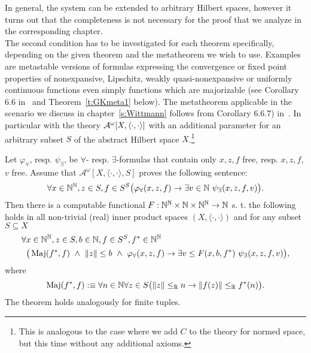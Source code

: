 In general, the system can be extended to arbitrary Hilbert spaces, however it turns out that the completeness
is not necessary for the proof that we analyze in the corresponding chapter.\\
The second condition has to be investigated for each theorem specifically, depending on
the given theorem and the metatheorem we wish to use. Examples are metastable versions of formulas 
expressing the convergence or fixed point properties
of nonexpansive, Lipschitz, weakly quasi-nonexpansive or uniformly continuous functions even simply functions 
which are majorizable (see Corollary 6.6 in~\cite{GK08} and Theorem~\ref{t:GKmeta1} below).
%
The metatheorem applicable
in the scenario we discuss in chapter~\ref{s:Wittmann} follows from Corollary 6.6.7) in~\cite{GK08}.
In particular with 
the theory $\mathcal{A}^\omega[X,\langle\cdot,\cdot\rangle]$ with an additional parameter for an arbitrary subset $S$ of the
abstract Hilbert space $X$.\footnote{This is analogous to the case where we add $C$ to the
theory for normed space, but this time without any additional axioms.}\\

\begin{thm}\label{t:GKmeta1}
Let $\varphi_\forall$, resp. $\psi_\exists$, be $\forall$-
resp. $\exists$-formulas that contain only $x,z,f$ free, resp. $x,z,f$, $v$ free. Assume that
$\mathcal{A}^\omega[X,\langle\cdot,\cdot\rangle,S]$ proves the following sentence:
\[
\forall  x\in\NN^\NN, z\in S, f\in{S^S} 
	\big( \varphi_\forall(x, z, f)\rightarrow\exists v\in\NN\ \psi_\exists(x, z, f, v)\big).
\]
Then there is a computable functional $F : \mathbb{N}^{\mathbb{N}}\times\mathbb{N}\times\mathbb{N}^{\mathbb{N}}\to\mathbb{N}$ s. t. the following holds
in all non-trivial (real) inner product spaces $(X,\langle\cdot,\cdot\rangle)$ 
and for any subset $S\subseteq X$
\begin{align*}
\forall  &x\in\NN^\NN, z\in S, b\in\NN, f\in{S^S},f^*\in\NN^\NN\\
	&\big( \TMaj(f^*,f)\ \wedge\ \|z\|\leq b\ \wedge\ \varphi_\forall(x, z, f) \rightarrow 
	\exists v\leq F(x,b,f^*)\ \psi_\exists(x, z, f, v) \big),
\end{align*}
where %
\[
\operatorname{Maj}(f^*,f):\equiv \forall n\in\mathbb{N}\forall z\in S \big( \|z\|\leq_{\mathbb{R}} n \rightarrow \|f(z)\|\leq_{\mathbb{R}} f^*(n)\big).
\]
The theorem holds analogously for finite tuples. %
\end{thm}

